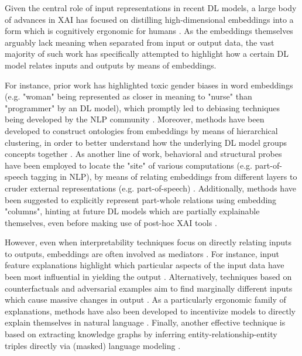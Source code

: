 Given the central role of input representations in recent DL models, a large body of advances in XAI has focused on distilling high-dimensional embeddings into a form which is cognitively ergonomic for humans \citep{madsen_post-hoc_2021}. As the embeddings themselves arguably lack meaning when separated from input or output data, the vast majority of such work has specifically attempted to highlight how a certain DL model relates inputs and outputs by means of embeddings.

For instance, prior work has highlighted toxic gender biases in word embeddings (e.g. "woman" being represented as closer in meaning to "nurse" than "programmer" by an DL model), which promptly led to debiasing techniques being developed by the NLP community \citep{bolukbasi_man_2016}. Moreover, methods have been developed to construct ontologies from embeddings by means of hierarchical clustering, in order to better understand how the underlying DL model groups concepts together \citep{liu_interpretation_2018}. As another line of work, behavioral and structural probes have been employed to locate the "site" of various computations (e.g. part-of-speech tagging in NLP), by means of relating embeddings from different layers to cruder external representations (e.g. part-of-speech) \citep{tenney_bert_2019}. Additionally, methods have been suggested to explicitly represent part-whole relations using embedding "columns", hinting at future DL models which are partially explainable themselves, even before making use of post-hoc XAI tools \citep{hinton_how_2021}.

However, even when interpretability techniques focus on directly relating inputs to outputs, embeddings are often involved as mediators \citep{danilevsky_survey_nodate}. For instance, input feature explanations highlight which particular aspects of the input data have been most influential in yielding the output \citep{jain_attention_nodate}. Alternatively, techniques based on counterfactuals and adversarial examples aim to find marginally different inputs which cause massive changes in output \citep{madsen_post-hoc_2021}. As a particularly ergonomic family of explanations, methods have also been developed to incentivize models to directly explain themselves in natural language \citep{madsen_post-hoc_2021}. Finally, another effective technique is based on extracting knowledge graphs by inferring entity-relationship-entity triples directly via (masked) language modeling \citep{wang_language_2020}.

